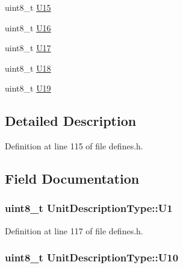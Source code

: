 \begin{DoxyCompactItemize}
\item 
uint8\+\_\+t \hyperlink{structUnitDescriptionType_a67851c4a906293451b0c3e49fe79329c}{U15}
\item 
uint8\+\_\+t \hyperlink{structUnitDescriptionType_a7ff11ef3bf5d3e485d300dc46bfc06d7}{U16}
\item 
uint8\+\_\+t \hyperlink{structUnitDescriptionType_a21f0e4e804978c6b29699ae3ed0e5060}{U17}
\item 
uint8\+\_\+t \hyperlink{structUnitDescriptionType_a5af9c5dc8c43c0c53b847bb0e25d8c18}{U18}
\item 
uint8\+\_\+t \hyperlink{structUnitDescriptionType_aeb14175b8f3acc759a3a3c0148a38123}{U19}
\end{DoxyCompactItemize}


\subsection{Detailed Description}


Definition at line 115 of file defines.\+h.



\subsection{Field Documentation}
\subsubsection[{\texorpdfstring{U1}{U1}}]{\setlength{\rightskip}{0pt plus 5cm}uint8\+\_\+t Unit\+Description\+Type\+::\+U1}\hypertarget{structUnitDescriptionType_a3752aa69edf4c75a4d7a00cead8074a4}{}\label{structUnitDescriptionType_a3752aa69edf4c75a4d7a00cead8074a4}


Definition at line 117 of file defines.\+h.

\subsubsection[{\texorpdfstring{U10}{U10}}]{\setlength{\rightskip}{0pt plus 5cm}uint8\+\_\+t Unit\+Description\+Type\+::\+U10}\hypertarget{structUnitDescriptionType_a2751eba36a1207fbeed39f8c1b99dd17}{}\label{structUnitDescriptionType_a2751eba36a1207fbeed39f8c1b99dd17}


